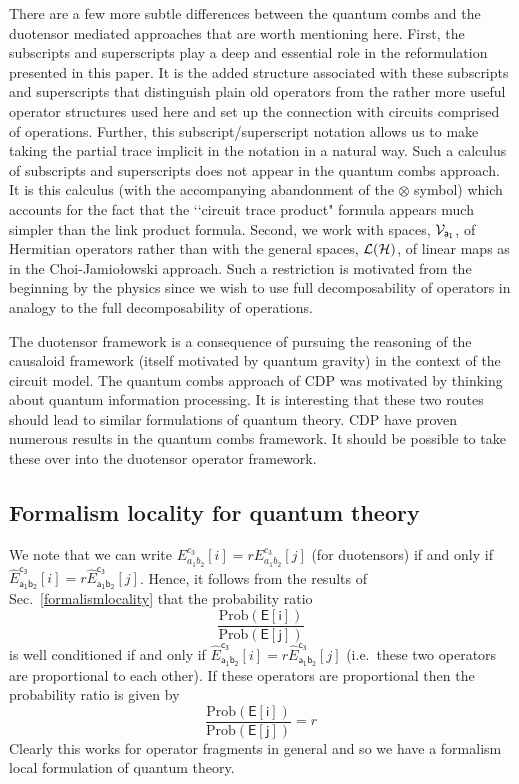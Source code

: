 \documentclass[10pt]{article}
\begin{document}
There are a few more subtle differences between the quantum combs and the duotensor mediated approaches that are worth mentioning here.  First, the subscripts and superscripts play a deep and essential role in the reformulation presented in this paper.  It is the added structure associated with these subscripts and superscripts that distinguish plain old operators from the rather more useful operator structures used here and set up the connection with circuits comprised of operations.   Further, this subscript/superscript notation allows us to make taking the partial trace implicit in the notation in a natural way.  Such a calculus of subscripts and superscripts does not appear in the quantum combs approach. It is this calculus (with the accompanying abandonment of the $\otimes$ symbol) which accounts for the fact that the \lq\lq circuit trace product" formula appears much simpler than the link product formula.   Second, we work with spaces, ${\cal V}_\mathsf{a_1}$, of Hermitian operators rather than with the general spaces, ${\cal L}(\cal H)$, of linear maps as in the Choi-Jamio\l owski approach.  Such a restriction is motivated from the beginning by the physics since we wish to use full decomposability of operators in analogy to the full decomposability of operations.

The duotensor framework is a consequence of pursuing the reasoning of the causaloid framework \cite{hardy2005probability} (itself motivated by quantum gravity) in the context of the circuit model.  The quantum combs approach of CDP  was motivated by thinking about quantum information processing.  It is interesting that these two routes should lead to similar formulations of quantum theory.  CDP have proven numerous results in the quantum combs framework.  It should be possible to take these over into the duotensor operator framework.


\subsection{Formalism locality for quantum theory}


We note that we can write $E_{a_1b_2}^{c_3}[i]= r E_{a_1b_2}^{c_3}[j]$ (for duotensors) if and only if $\hat E_\mathsf{a_1b_2}^\mathsf{c_3}[i]=r\hat E_\mathsf{a_1b_2}^\mathsf{c_3}[j]$.  Hence, it follows from the results of Sec.\ \ref{formalismlocality} that the probability ratio
\begin{equation}
\frac{\text{Prob}(\mathsf{E[i]})}{\text{Prob}(\mathsf{E[j]})}
\end{equation}
is well conditioned if and only if $\hat E_\mathsf{a_1b_2}^\mathsf{c_3}[i]=r\hat E_\mathsf{a_1b_2}^\mathsf{c_3}[j]$ (i.e.\ these two operators are proportional to each other).  If these operators are proportional then the probability ratio is given by
\begin{equation}
\frac{\text{Prob}(\mathsf{E[i]})}{\text{Prob}(\mathsf{E[j]})} = r
\end{equation}
Clearly this works for operator fragments in general and so we have a formalism local formulation of quantum theory.
\end{document}

